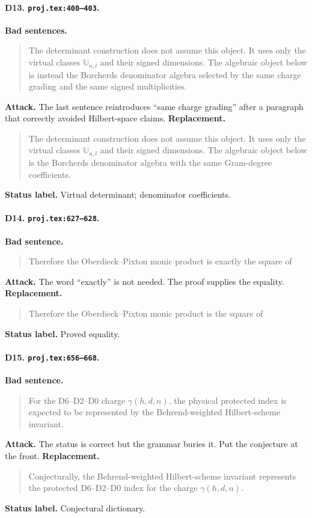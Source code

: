 \paragraph{D13. \texttt{proj.tex:400--403}.}
\textbf{Bad sentences.}
\begin{quote}\small
The determinant construction does not assume this object.  It uses only
the virtual classes \(\mathbb U_{n,l}\) and their signed dimensions.  The
algebraic object below is instead the Borcherds denominator algebra
selected by the same charge grading and the same signed multiplicities.
\end{quote}
\textbf{Attack.}
The last sentence reintroduces ``same charge grading'' after a paragraph
that correctly avoided Hilbert-space claims.
\textbf{Replacement.}
\begin{quote}\small
The determinant construction does not assume this object.  It uses only
the virtual classes \(\mathbb U_{n,l}\) and their signed dimensions.  The
algebraic object below is the Borcherds denominator algebra with the same
Gram-degree coefficients.
\end{quote}
\textbf{Status label.} Virtual determinant; denominator coefficients.

\paragraph{D14. \texttt{proj.tex:627--628}.}
\textbf{Bad sentence.}
\begin{quote}\small
Therefore the Oberdieck--Pixton monic product is exactly the square of
\end{quote}
\textbf{Attack.}
The word ``exactly'' is not needed.  The proof supplies the equality.
\textbf{Replacement.}
\begin{quote}\small
Therefore the Oberdieck--Pixton monic product is the square of
\end{quote}
\textbf{Status label.} Proved equality.

\paragraph{D15. \texttt{proj.tex:656--668}.}
\textbf{Bad sentence.}
\begin{quote}\small
For the D6--D2--D0 charge \(\gamma(h,d,n)\), the physical protected index
is expected to be represented by the Behrend-weighted Hilbert-scheme
invariant.
\end{quote}
\textbf{Attack.}
The status is correct but the grammar buries it.  Put the conjecture at
the front.
\textbf{Replacement.}
\begin{quote}\small
Conjecturally, the Behrend-weighted Hilbert-scheme invariant represents
the protected D6--D2--D0 index for the charge \(\gamma(h,d,n)\).
\end{quote}
\textbf{Status label.} Conjectural dictionary.

